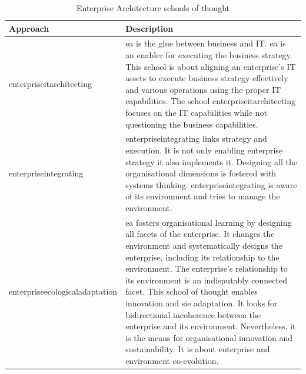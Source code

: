\begin{longtable}{p{}p{}}
	\toprule%
	\textbf{Approach} & \textbf{Description} \\%
	\midrule%
	\endhead%
	\hline
	\endfoot%
	\caption[Enterprise Architecture schools of thought]{Enterprise Architecture schools of thought}
	\label{tab:tbschoolsofthought}
	\endlastfoot%
	\gls{enterpriseitarchitecting} & \acrshort{ea} is the glue between business and IT. \acrshort{ea} is an enabler for executing the business strategy. This school is about aligning an enterprise's IT assets to execute business strategy effectively and various operations using the proper IT capabilities. The school \gls{enterpriseitarchitecting} focuses on the IT capabilities while not questioning the business capabilities. \\%
	\gls{enterpriseintegrating} & \gls{enterpriseintegrating} links strategy and execution. It is not only enabling enterprise strategy it also implements it. Designing all the organisational dimensions is fostered with systems thinking. \gls{enterpriseintegrating} is aware of its environment and tries to manage the environment. \\%
	\gls{enterpriseecologicaladaptation} & \acrshort{ea} fosters organisational learning by designing all facets of the enterprise. It changes the environment and systematically designs the enterprise, including its relationship to the environment. The enterprise's relationship to its environment is an indisputably connected facet. This school of thought enables innovation and \gls{sie} adaptation. It looks for bidirectional incoherence between the enterprise and its environment. Nevertheless, it is the means for organisational innovation and sustainability. It is about enterprise and environment co-evolution. \\%
	\bottomrule%
\end{longtable}
